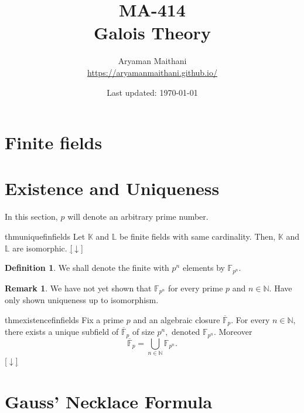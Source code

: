 \documentclass[12pt,oneside]{book}
\title{MA-414\\Galois Theory}
\author{Aryaman Maithani\\\url{https://aryamanmaithani.github.io/}}
\date{Last updated: \today}
\theoremstyle{definition}
\numberwithin{thm}{chapter}
\newtheorem{defn}[thm]{Definition}
\newtheorem{rem}[thm]{Remark}
\newcommand{\downsym}{[$\downarrow$]}
\begin{document}
\maketitle
\tableofcontents
\setcounter{chapter}{-1}






\section{Finite fields}

\section{Existence and Uniqueness}

In this section, $p$ will denote an arbitrary prime number.

\begin{restatable}{thm}{uniquefinfields}
\label{thm:uniquefinfields}
    Let $\mathbb{K}$ and $\mathbb{L}$ be finite fields with same cardinality. Then, $\mathbb{K}$ and $\mathbb{L}$ are isomorphic. \hfill\hyperref[thm:uniquefinfields2]{\downsym}
\end{restatable}

\begin{defn}%
    We shall denote the finite with $p^n$ elements by $\mathbb{F}_{p^n}.$
\end{defn}

\begin{rem}
    We have not yet shown that $\mathbb{F}_{p^n}$ for every prime $p$ and $n \in \mathbb{N}.$ Have only shown uniqueness up to isomorphism.
\end{rem}

\begin{restatable}{thm}{existencefinfields}
\label{thm:existencefinfields}
    Fix a prime $p$ and an algebraic closure $\overline{\mathbb{F}}_p.$ For every $n \in \mathbb{N},$ there exists a unique subfield of $\overline{\mathbb{F}}_p$ of size $p^n,$ denoted $\mathbb{F}_{p^n}.$ Moreover
    \begin{equation*} 
        \overline{\mathbb{F}}_p = \bigcup_{n \in \mathbb{N}} \mathbb{F}_{p^n}.
    \end{equation*}
    \hfill\hyperref[thm:existencefinfields2]{\downsym}
\end{restatable}

\section{Gauss' Necklace Formula}
\end{document}
